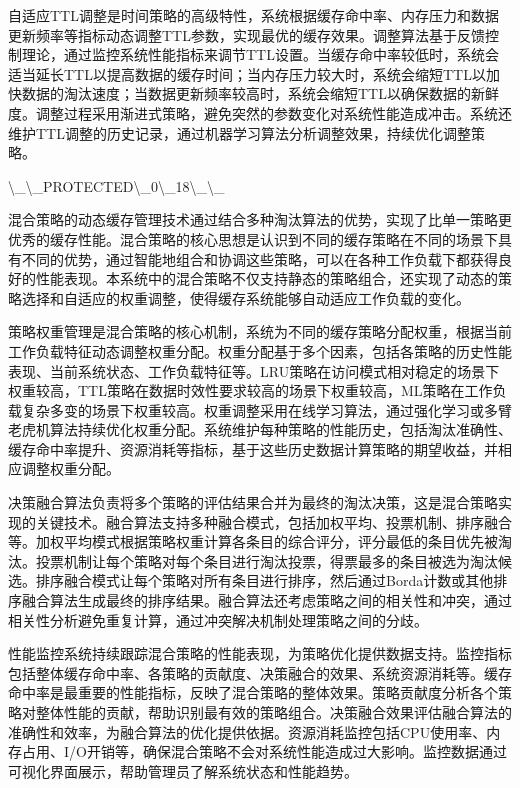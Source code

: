 自适应TTL调整是时间策略的高级特性，系统根据缓存命中率、内存压力和数据更新频率等指标动态调整TTL参数，实现最优的缓存效果。调整算法基于反馈控制理论，通过监控系统性能指标来调节TTL设置。当缓存命中率较低时，系统会适当延长TTL以提高数据的缓存时间；当内存压力较大时，系统会缩短TTL以加快数据的淘汰速度；当数据更新频率较高时，系统会缩短TTL以确保数据的新鲜度。调整过程采用渐进式策略，避免突然的参数变化对系统性能造成冲击。系统还维护TTL调整的历史记录，通过机器学习算法分析调整效果，持续优化调整策略。

\textbackslash{}_\textbackslash{}_PROTECTED\textbackslash{}_0\textbackslash{}_18\textbackslash{}_\textbackslash{}_

混合策略的动态缓存管理技术通过结合多种淘汰算法的优势，实现了比单一策略更优秀的缓存性能。混合策略的核心思想是认识到不同的缓存策略在不同的场景下具有不同的优势，通过智能地组合和协调这些策略，可以在各种工作负载下都获得良好的性能表现。本系统中的混合策略不仅支持静态的策略组合，还实现了动态的策略选择和自适应的权重调整，使得缓存系统能够自动适应工作负载的变化。

策略权重管理是混合策略的核心机制，系统为不同的缓存策略分配权重，根据当前工作负载特征动态调整权重分配。权重分配基于多个因素，包括各策略的历史性能表现、当前系统状态、工作负载特征等。LRU策略在访问模式相对稳定的场景下权重较高，TTL策略在数据时效性要求较高的场景下权重较高，ML策略在工作负载复杂多变的场景下权重较高。权重调整采用在线学习算法，通过强化学习或多臂老虎机算法持续优化权重分配。系统维护每种策略的性能历史，包括淘汰准确性、缓存命中率提升、资源消耗等指标，基于这些历史数据计算策略的期望收益，并相应调整权重分配。

决策融合算法负责将多个策略的评估结果合并为最终的淘汰决策，这是混合策略实现的关键技术。融合算法支持多种融合模式，包括加权平均、投票机制、排序融合等。加权平均模式根据策略权重计算各条目的综合评分，评分最低的条目优先被淘汰。投票机制让每个策略对每个条目进行淘汰投票，得票最多的条目被选为淘汰候选。排序融合模式让每个策略对所有条目进行排序，然后通过Borda计数或其他排序融合算法生成最终的排序结果。融合算法还考虑策略之间的相关性和冲突，通过相关性分析避免重复计算，通过冲突解决机制处理策略之间的分歧。

性能监控系统持续跟踪混合策略的性能表现，为策略优化提供数据支持。监控指标包括整体缓存命中率、各策略的贡献度、决策融合的效果、系统资源消耗等。缓存命中率是最重要的性能指标，反映了混合策略的整体效果。策略贡献度分析各个策略对整体性能的贡献，帮助识别最有效的策略组合。决策融合效果评估融合算法的准确性和效率，为融合算法的优化提供依据。资源消耗监控包括CPU使用率、内存占用、I/O开销等，确保混合策略不会对系统性能造成过大影响。监控数据通过可视化界面展示，帮助管理员了解系统状态和性能趋势。

